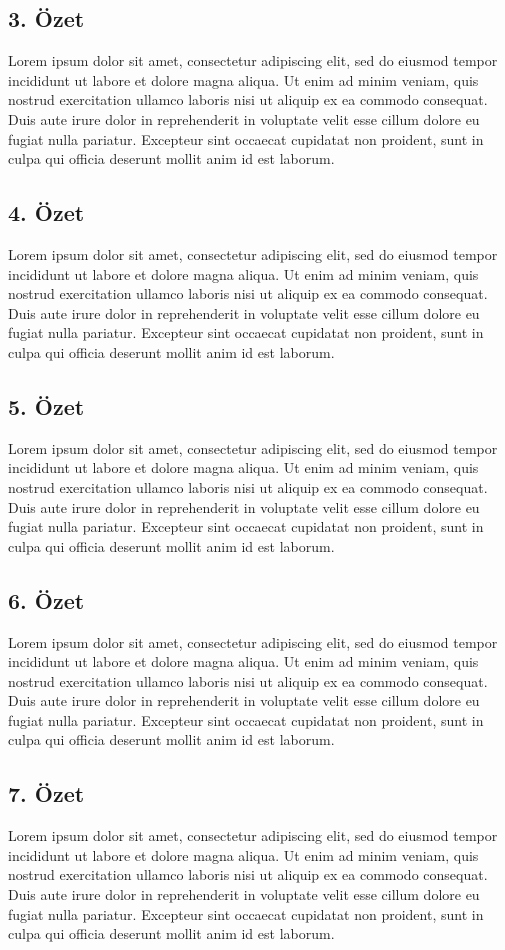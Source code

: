 \subsection{3. Özet}
Lorem ipsum dolor sit amet, consectetur adipiscing elit, sed do eiusmod tempor incididunt ut labore et dolore magna aliqua. Ut enim ad minim veniam, quis nostrud exercitation ullamco laboris nisi ut aliquip ex ea commodo consequat. Duis aute irure dolor in reprehenderit in voluptate velit esse cillum dolore eu fugiat nulla pariatur. Excepteur sint occaecat cupidatat non proident, sunt in culpa qui officia deserunt mollit anim id est laborum.
\subsection{4. Özet}
Lorem ipsum dolor sit amet, consectetur adipiscing elit, sed do eiusmod tempor incididunt ut labore et dolore magna aliqua. Ut enim ad minim veniam, quis nostrud exercitation ullamco laboris nisi ut aliquip ex ea commodo consequat. Duis aute irure dolor in reprehenderit in voluptate velit esse cillum dolore eu fugiat nulla pariatur. Excepteur sint occaecat cupidatat non proident, sunt in culpa qui officia deserunt mollit anim id est laborum.
\subsection{5. Özet}
Lorem ipsum dolor sit amet, consectetur adipiscing elit, sed do eiusmod tempor incididunt ut labore et dolore magna aliqua. Ut enim ad minim veniam, quis nostrud exercitation ullamco laboris nisi ut aliquip ex ea commodo consequat. Duis aute irure dolor in reprehenderit in voluptate velit esse cillum dolore eu fugiat nulla pariatur. Excepteur sint occaecat cupidatat non proident, sunt in culpa qui officia deserunt mollit anim id est laborum.
\subsection{6. Özet}
Lorem ipsum dolor sit amet, consectetur adipiscing elit, sed do eiusmod tempor incididunt ut labore et dolore magna aliqua. Ut enim ad minim veniam, quis nostrud exercitation ullamco laboris nisi ut aliquip ex ea commodo consequat. Duis aute irure dolor in reprehenderit in voluptate velit esse cillum dolore eu fugiat nulla pariatur. Excepteur sint occaecat cupidatat non proident, sunt in culpa qui officia deserunt mollit anim id est laborum.
\subsection{7. Özet}
Lorem ipsum dolor sit amet, consectetur adipiscing elit, sed do eiusmod tempor incididunt ut labore et dolore magna aliqua. Ut enim ad minim veniam, quis nostrud exercitation ullamco laboris nisi ut aliquip ex ea commodo consequat. Duis aute irure dolor in reprehenderit in voluptate velit esse cillum dolore eu fugiat nulla pariatur. Excepteur sint occaecat cupidatat non proident, sunt in culpa qui officia deserunt mollit anim id est laborum.
